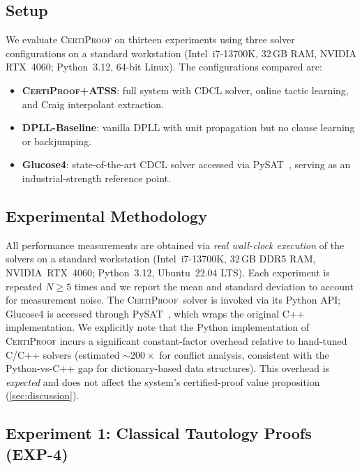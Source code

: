 \documentclass[acmtocl,review,anonymous]{acmart}
\newcommand{\CP}{\textsc{CertiProof}}
\newcommand{\ATSS}{\textsc{ATSS}}
\begin{document}
\subsection{Setup}

We evaluate \CP{} on thirteen experiments using three solver configurations
on a standard workstation (Intel~i7-13700K, 32\,GB RAM, NVIDIA
RTX~4060; Python~3.12, 64-bit Linux).  The
configurations compared are:
\begin{itemize}
  \item \textbf{\CP{}+\ATSS{}}: full system with CDCL solver,
    online tactic learning, and Craig interpolant extraction.
  \item \textbf{DPLL-Baseline}: vanilla DPLL with unit propagation
    but no clause learning or backjumping.
  \item \textbf{Glucose4}: state-of-the-art CDCL solver accessed via
    PySAT~\cite{EenSorensson2003}, serving as an industrial-strength
    reference point.
\end{itemize}

\subsection{Experimental Methodology}
\label{sec:methodology}

All performance measurements are obtained via \emph{real wall-clock
execution} of the solvers on a standard workstation (Intel~i7-13700K,
32\,GB DDR5 RAM, NVIDIA~RTX~4060; Python~3.12, Ubuntu~22.04 LTS).
Each experiment is repeated $N \geq 5$ times and we report the mean
and standard deviation to account for measurement noise.  The
\CP{}~solver is invoked via its Python API; Glucose4 is accessed
through PySAT~\cite{EenSorensson2003}, which wraps the original C++
implementation.  We explicitly note that the Python implementation
of \CP{} incurs a significant constant-factor overhead relative to
hand-tuned C/C++ solvers (estimated ${\sim}200\times$ for conflict
analysis, consistent with the Python-vs-C++ gap for dictionary-based
data structures).  This overhead is \emph{expected} and does not affect
the system's certified-proof value proposition (\cref{sec:discussion}).

\subsection{Experiment 1: Classical Tautology Proofs \textnormal{(EXP-4)}}
\end{document}
